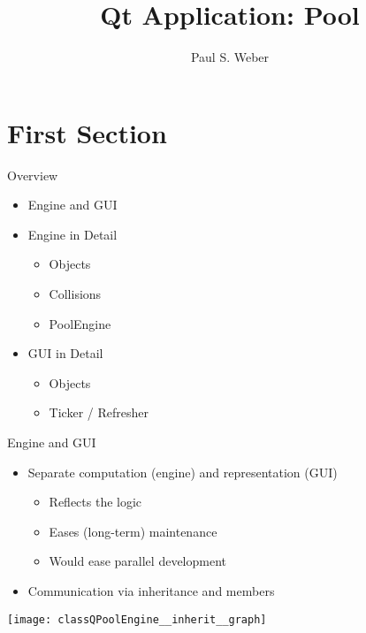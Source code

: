 \documentclass{beamer}
\title{Qt Application: Pool}
\date{}
\author{Paul S. Weber}
\begin{document}
\maketitle
\section{First Section}

\begin{frame}{Overview}
	\begin{itemize}
		\item Engine and GUI
		
		\vspace*{1em}
		\item Engine in Detail
		\begin{itemize}
			\item Objects
			\item Collisions
			\item PoolEngine
		\end{itemize}
		
		\vspace*{1em}
		\item GUI in Detail
		\begin{itemize}
			\item Objects
			\item Ticker / Refresher
		\end{itemize}
	\end{itemize}
\end{frame}

\begin{frame}{Engine and GUI}
	\begin{itemize}
		\item Separate computation (engine) and representation (GUI)
		\begin{itemize}
			\item Reflects the logic
			\item Eases (long-term) maintenance
			\item Would ease parallel development
		\end{itemize}
		
		\vspace*{1em}
		\item Communication via inheritance and members
	\end{itemize}
	\begin{center}
		\texttt{[image: classQPoolEngine\_\_inherit\_\_graph]}
	\end{center}
\end{frame}
\end{document}
